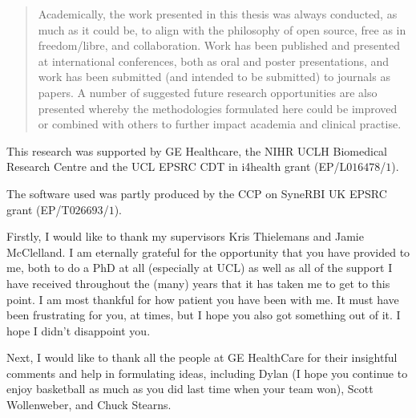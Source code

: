 \begin{impactstatement}
\begin{quote}
        Academically, the work presented in this thesis was always conducted, as much as it could be, to align with the philosophy of open source, free as in freedom/libre, and collaboration. Work has been published and presented at international conferences, both as oral and poster presentations, and work has been submitted (and intended to be submitted) to journals as papers. A number of suggested future research opportunities are also presented whereby the methodologies formulated here could be improved or combined with others to further impact academia and clinical practise.
    \end{quote}
\end{impactstatement}

\begin{acknowledgements}
    This research was supported by \gls{GE} Healthcare, the \gls{NIHR} \gls{UCLH} Biomedical Research Centre and the \gls{UCL} \gls{EPSRC} \gls{CDT} in \gls{i4health} grant (EP/L$016478$/$1$).
    
    The software used was partly produced by the \gls{CCP} on \gls{SyneRBI} \gls{UK} \gls{EPSRC} grant (EP/T$026693$/$1$).

    Firstly, I would like to thank my supervisors Kris Thielemans and Jamie McClelland. I am eternally grateful for the opportunity that you have provided to me, both to do a \gls{PhD} at all (especially at \gls{UCL}) as well as all of the support I have received throughout the (many) years that it has taken me to get to this point. I am most thankful for how patient you have been with me. It must have been frustrating for you, at times, but I hope you also got something out of it. I hope I didn't disappoint you.

    Next, I would like to thank all the people at \gls{GE} HealthCare for their insightful comments and help in formulating ideas, including Dylan (I hope you continue to enjoy basketball as much as you did last time when your team won), Scott Wollenweber, and Chuck Stearns.


\end{acknowledgements}
